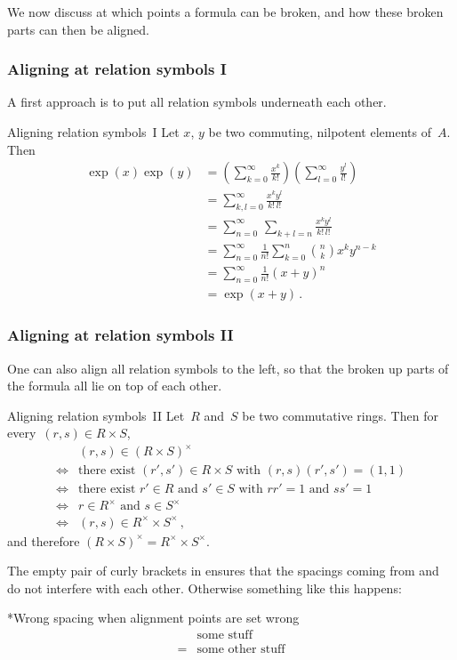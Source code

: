 We now discuss at which points a formula can be broken, and how these broken parts can then be aligned.

\subsubsection{Aligning at relation symbols I}

A first approach is to put all relation symbols underneath each other.
\begin{showlatex}{Aligning relation symbols~I}
Let $x$, $y$ be two commuting, nilpotent elements of~$A$.
Then
\begin{align*}
  \exp(x) \exp(y)
  &=
  \left( \sum_{k=0}^\infty \frac{x^k}{k!} \right)
  \left( \sum_{l=0}^\infty \frac{y^l}{l!} \right)
  \\
  &=
  \sum_{k,l=0}^\infty \frac{x^k y^l}{k! \, l!}
  \\
  &=
  \sum_{n=0}^\infty \, \sum_{k+l = n} \frac{x^k y^l}{k! \, l!}
  \\
  &=
  \sum_{n=0}^\infty \frac{1}{n!} \sum_{k=0}^n \binom{n}{k} x^k y^{n-k}
  \\
  &=
  \sum_{n=0}^\infty \frac{1}{n!} (x + y)^n
  \\
  &=
  \exp(x + y) \,.
\end{align*}
\end{showlatex}

\subsubsection{Aligning at relation symbols II}

One can also align all relation symbols to the left, so that the broken up parts of the formula all lie on top of each other.
\begin{showlatex}{Aligning relation symbols~II}
Let~$R$ and~$S$ be two commutative rings.
Then for every~$(r,s) \in R \times S$,
\begin{align*}
  {}&
  (r, s) \in (R \times S)^\times
  \\
  \iff{}&
  \text{there exist $(r', s') \in R \times S$ with $(r,s)(r',s') = (1,1)$}
  \\
  \iff{}&
  \text{there exist $r' \in R$ and $s' \in S$ with $rr' = 1$ and $ss' = 1$}
  \\
  \iff{}&
  \text{$r \in R^\times$ and $s \in S^\times$}
  \\
  \iff{}&
  (r,s) \in R^\times \times S^\times \,,
\end{align*}
and therefore $(R \times S)^{\times} = R^\times \times S^\times$.
\end{showlatex}
The empty pair of curly brackets in  ensures that the spacings coming from  and~\inlinecode{\&} do not interfere with each other.
Otherwise something like this happens:
\begin{showlatex}*{Wrong spacing when alignment points are set wrong}
  \begin{align*}
     &\text{some stuff} \\
    =&\text{some other stuff}
  \end{align*}
\end{showlatex}

